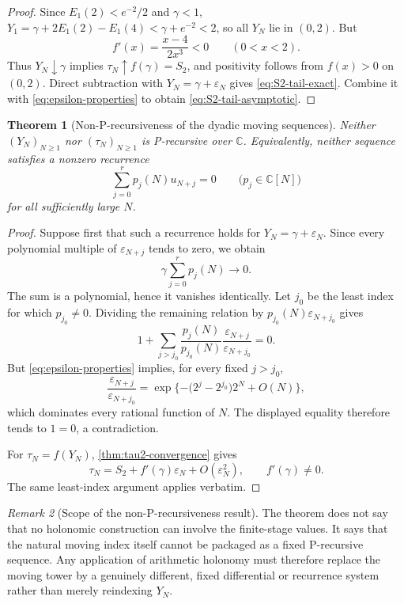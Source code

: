 \documentclass[11pt]{article}
\newtheorem{theorem}{Theorem}[section]
\theoremstyle{definition}
\theoremstyle{remark}
\newtheorem{remark}[theorem]{Remark}
\newcommand{\C}{\mathbb C}
\begin{document}
\begin{proof}
Since \(E_1(2)<e^{-2}/2\) and \(\gamma<1\),
\(Y_1=\gamma+2E_1(2)-E_1(4)<\gamma+e^{-2}<2\), so all \(Y_N\) lie in
\((0,2)\).  But
\[
 f'(x)=\frac{x-4}{2x^3}<0\qquad(0<x<2).
\]
Thus \(Y_N\downarrow\gamma\) implies \(\tau_N\uparrow f(\gamma)=S_2\), and
positivity follows from \(f(x)>0\) on \((0,2)\).  Direct subtraction with
\(Y_N=\gamma+\varepsilon_N\) gives \eqref{eq:S2-tail-exact}.  Combine it
with \eqref{eq:epsilon-properties} to obtain
\eqref{eq:S2-tail-asymptotic}.
\end{proof}

\begin{theorem}[Non-P-recursiveness of the dyadic moving sequences]
\label{thm:non-p-recursive}
Neither \((Y_N)_{N\ge1}\) nor \((\tau_N)_{N\ge1}\) is P-recursive over
\(\C\).  Equivalently, neither sequence satisfies a nonzero recurrence
\[
 \sum_{j=0}^r p_j(N)u_{N+j}=0
 \qquad\bigl(p_j\in\C[N]\bigr)
\]
for all sufficiently large \(N\).
\end{theorem}

\begin{proof}
Suppose first that such a recurrence holds for \(Y_N=\gamma+\varepsilon_N\).
Since every polynomial multiple of \(\varepsilon_{N+j}\) tends to zero, we
obtain
\[
 \gamma\sum_{j=0}^rp_j(N)\longrightarrow0.
\]
The sum is a polynomial, hence it vanishes identically.  Let \(j_0\) be the
least index for which \(p_{j_0}\ne0\).  Dividing the remaining relation by
\(p_{j_0}(N)\varepsilon_{N+j_0}\) gives
\[
 1+\sum_{j>j_0}
 \frac{p_j(N)}{p_{j_0}(N)}
 \frac{\varepsilon_{N+j}}{\varepsilon_{N+j_0}}=0.
\]
But \eqref{eq:epsilon-properties} implies, for every fixed \(j>j_0\),
\[
 \frac{\varepsilon_{N+j}}{\varepsilon_{N+j_0}}
 =\exp\{-\bigl(2^j-2^{j_0}\bigr)2^N+O(N)\},
\]
which dominates every rational function of \(N\).  The displayed equality
therefore tends to \(1=0\), a contradiction.

For \(\tau_N=f(Y_N)\), \cref{thm:tau2-convergence} gives
\[
 \tau_N=S_2+f'(\gamma)\varepsilon_N+O(\varepsilon_N^2),
 \qquad f'(\gamma)\ne0.
\]
The same least-index argument applies verbatim.
\end{proof}

\begin{remark}[Scope of the non-P-recursiveness result]
The theorem does not say that no holonomic construction can involve the
finite-stage values.  It says that the natural moving index itself cannot be
packaged as a fixed P-recursive sequence.  Any application of arithmetic
holonomy must therefore replace the moving tower by a genuinely different,
fixed differential or recurrence system rather than merely reindexing
\(Y_N\).
\end{remark}
\end{document}
